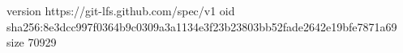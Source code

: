 version https://git-lfs.github.com/spec/v1
oid sha256:8e3dcc997f0364b9c0309a3a1134e3f23b23803bb52fade2642e19bfe7871a69
size 70929
